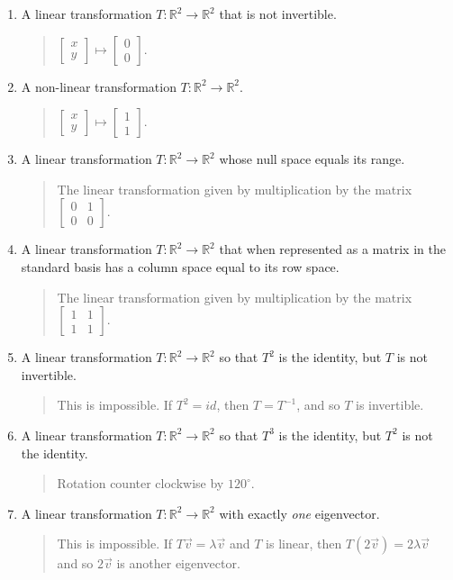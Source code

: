\documentclass[letter]{article}
\newcommand{\R}{\mathbb{R}}
\newcommand{\mat}[1]{\begin{bmatrix}#1\end{bmatrix}}
\begin{document}
\begin{enumerate}
\begin{enumerate}
			\item A linear transformation $T:\R^2\to\R^2$ that is not invertible.
			\begin{quote}
				$\mat{x\\y}\mapsto\mat{0\\0}$.
			\end{quote}

			\item A non-linear transformation $T:\R^2\to\R^2$.
			\begin{quote}
				$\mat{x\\y}\mapsto\mat{1\\1}$.
			\end{quote}

			\item A linear transformation $T:\R^2\to\R^2$ whose null space equals its range.
			\begin{quote}
				The linear transformation given by multiplication by the matrix
				$\mat{0&1\\0&0}$.
			\end{quote}

			\item A linear transformation $T:\R^2\to\R^2$ that when represented as a matrix in
			the standard basis has a column space equal to its row space.
			\begin{quote}
				The linear transformation given by multiplication by the matrix
				$\mat{1&1\\1&1}$.
			\end{quote}

			\item A linear transformation $T:\R^2\to\R^2$ so that $T^2$ is the identity, but $T$ is not invertible.
			\begin{quote}
				This is impossible.  If $T^2=id$, then $T=T^{-1}$, and so $T$ is invertible.
			\end{quote}

			\item A linear transformation $T:\R^2\to\R^2$ so that $T^3$ is the identity, but $T^2$ is not the identity.
			\begin{quote}
				Rotation counter clockwise by $120^{\circ}$.
			\end{quote}

			\item A linear transformation $T:\R^2\to\R^2$ with exactly \emph{one} eigenvector.
			\begin{quote}
				This is impossible.  If $T\vec v=\lambda \vec v$ and $T$ is linear, then $T(2\vec v)=2\lambda \vec v$
				and so $2\vec v$ is another eigenvector.
			\end{quote}


\end{enumerate}
\end{enumerate}
\end{document}
